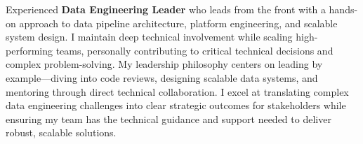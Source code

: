 
\begin{cvsummary}
  \summary
    {Experienced \textbf{Data Engineering Leader} who leads from the front with a hands-on approach to data pipeline architecture, platform engineering, and scalable system design.
    I maintain deep technical involvement while scaling high-performing teams, personally contributing to critical technical decisions and complex problem-solving.
    My leadership philosophy centers on leading by example—diving into code reviews, designing scalable data systems, and mentoring through direct technical collaboration.
    I excel at translating complex data engineering challenges into clear strategic outcomes for stakeholders while ensuring my team has the technical guidance and support needed to deliver robust, scalable solutions.
    }
\end{cvsummary}